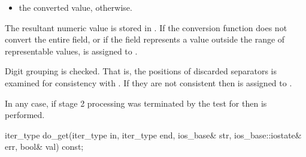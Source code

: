 \begin{itemdescr}
\begin{description}
\begin{itemize}
\item the converted value, otherwise.
\end{itemize}

The resultant numeric value is stored in .
If the conversion function does not convert the entire field, or
if the field represents a value outside the range of representable values,
 is assigned to .

\end{description}

\pnum
Digit grouping is checked.
That is, the positions of discarded
separators is examined for consistency with
.
If they are not consistent then
is assigned to .

\pnum
In any case, if stage 2 processing was terminated by the test for
then
is performed.
\end{itemdescr}

%
\begin{itemdecl}
iter_type do_get(iter_type in, iter_type end, ios_base& str,
                 ios_base::iostate& err, bool& val) const;
\end{itemdecl}

